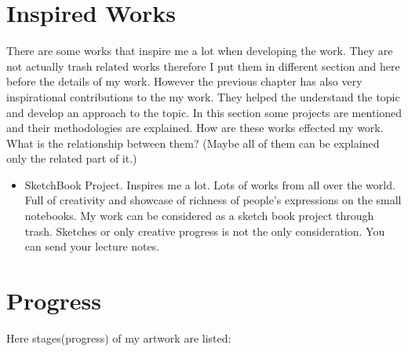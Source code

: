 \section{Inspired Works}
There are some works that inspire me a lot when developing the work. They are not actually trash related works therefore I put them in different section and here before the details of my work. However the previous chapter has also very inspirational contributions to the my work. They helped the understand the topic and develop an approach to the topic. In this section some projects are mentioned and their methodologies are explained. How are these works effected my work. What is the relationship between them? (Maybe all of them can be explained only the related part of it.)
\begin{itemize}
\item SketchBook Project. Inspires me a lot. Lots of works from all over the world. Full of creativity and showcase of richness of people's expressions on the small notebooks. My work can be considered as a sketch book project through trash. Sketches or only creative progress is not the only consideration. You can send your lecture notes. 
\end{itemize}


\section{Progress}
Here stages(progress) of my artwork are listed:

